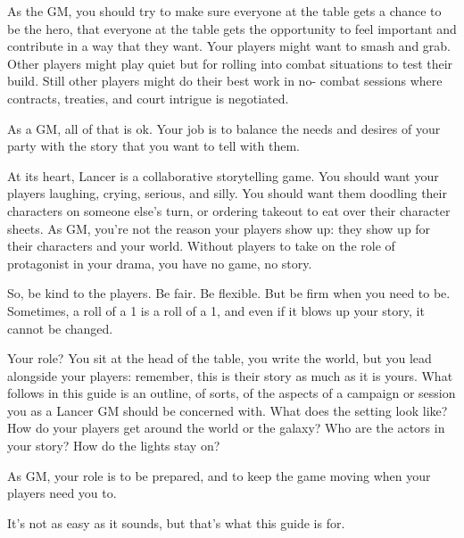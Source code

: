 As the GM, you should try to make sure everyone at the table gets a chance to be the hero,  
that everyone at the table gets the opportunity to feel important and contribute in a way that they  
want. Your players might want to smash and grab. Other players might play quiet but for rolling  
into combat situations to test their build. Still other players might do their best work in no- 
combat sessions where contracts, treaties, and court intrigue is negotiated. 
 

As a GM, all of that is ok. Your job is to balance the needs and desires of your party with the  
story that you want to tell with them. 
 

At its heart, Lancer is a collaborative storytelling game. You should want your players  
laughing, crying, serious, and silly. You should want them doodling their characters on someone  
else’s turn, or ordering takeout to eat over their character sheets. As GM, you’re not the reason  
your players show up: they show up for their characters and your world. Without players to take  
on the role of protagonist in your drama, you have no game, no story. 
 

So, be kind to the players. Be fair. Be flexible. But be firm when you need to be. Sometimes, a  
roll of a 1 is a roll of a 1, and even if it blows up your story, it cannot be changed. 
 

                                                                                                          


Your role? You sit at the head of the table, you write the world, but you lead alongside your  
players: remember, this is their story as much as it is yours. What follows in this guide is an  
outline, of sorts, of the aspects of a campaign or session you as a Lancer GM should be  
concerned with. What does the setting look like? How do your players get around the world or  
the galaxy? Who are the actors in your story? How do the lights stay on? 
 

As GM, your role is to be prepared, and to keep the game moving when your players need you  
to. 
 

It’s not as easy as it sounds, but that’s what this guide is for. 
 